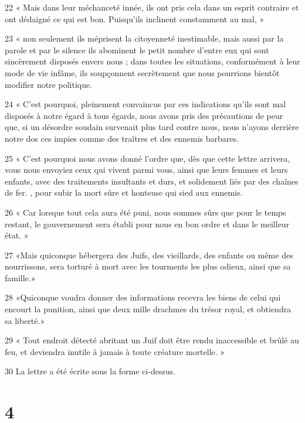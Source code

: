 \par 22 « Mais dans leur méchanceté innée, ils ont pris cela dans un esprit contraire et ont dédaigné ce qui est bon. Puisqu’ils inclinent constamment au mal, »
\par 23 « non seulement ils méprisent la citoyenneté inestimable, mais aussi par la parole et par le silence ils abominent le petit nombre d'entre eux qui sont sincèrement disposés envers nous ; dans toutes les situations, conformément à leur mode de vie infâme, ils soupçonnent secrètement que nous pourrions bientôt modifier notre politique.
\par 24 « C'est pourquoi, pleinement convaincus par ces indications qu'ils sont mal disposés à notre égard à tous égards, nous avons pris des précautions de peur que, si un désordre soudain survenait plus tard contre nous, nous n'ayons derrière notre dos ces impies comme des traîtres et des ennemis barbares.
\par 25 « C'est pourquoi nous avons donné l'ordre que, dès que cette lettre arrivera, vous nous envoyiez ceux qui vivent parmi vous, ainsi que leurs femmes et leurs enfants, avec des traitements insultants et durs, et solidement liés par des chaînes de fer. , pour subir la mort sûre et honteuse qui sied aux ennemis.
\par 26 « Car lorsque tout cela aura été puni, nous sommes sûrs que pour le temps restant, le gouvernement sera établi pour nous en bon ordre et dans le meilleur état. »
\par 27 «Mais quiconque hébergera des Juifs, des vieillards, des enfants ou même des nourrissons, sera torturé à mort avec les tourments les plus odieux, ainsi que sa famille.»
\par 28 «Quiconque voudra donner des informations recevra les biens de celui qui encourt la punition, ainsi que deux mille drachmes du trésor royal, et obtiendra sa liberté.»
\par 29 « Tout endroit détecté abritant un Juif doit être rendu inaccessible et brûlé au feu, et deviendra inutile à jamais à toute créature mortelle. »
\par 30 La lettre a été écrite sous la forme ci-dessus.

\chapter{4}

